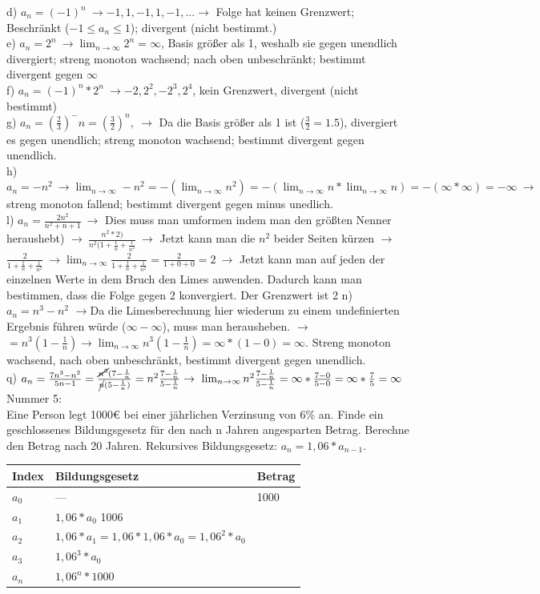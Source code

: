 \documentclass{article}
\newcommand{\tto}{\ensuremath{\to}}
\begin{document}
	d) $a_n=(-1)^n\ \to -1, 1, -1, 1, -1, ... \to$ Folge hat keinen Grenzwert; Beschränkt ($-1\leq a_n \leq 1$); divergent (nicht bestimmt.) \\
	e) $a_n=2^n\ \to \lim_{n\to\infty}2^n=\infty$, Basis größer als 1, weshalb sie gegen unendlich divergiert; streng monoton wachsend; nach oben unbeschränkt; bestimmt divergent gegen $\infty$ \\
	f) $a_n=(-1)^n*2^n\ \to -2, 2^2, -2^3, 2^4$, kein Grenzwert, divergent (nicht bestimmt) \\
	g) $a_n=(\frac{2}{3})^-n=(\frac{3}{2})^n,\ \to$ Da die Basis größer als 1 ist ($\frac{3}{2}=1.5$), divergiert es gegen unendlich; streng monoton wachsend; bestimmt divergent gegen unendlich. \\
	h) $a_n=-n^2\ \to \lim_{n\to\infty}-n^2=-(\lim_{n\to\infty}n^2)=-(\lim_{n\to\infty}n*\lim_{n\to\infty}n)=-(\infty*\infty)=-\infty\ \to$ streng monoton fallend; bestimmt divergent gegen minus unedlich. \\
	l) $a_n=\frac{2n^2}{n^2+n+1}\ \to$ Dies muss man umformen indem man den größten Nenner heraushebt) $\to\ \frac{n^2*2)}{n^2(1+\frac{1}{n}+\frac{1}{n^2}}\ \to$ Jetzt kann man die $n^2$ beider Seiten kürzen $\to$ \\
	$\frac{2}{1+\frac{1}{n}+\frac{1}{n^2}}\ \to \lim_{n\to\infty}\frac{2}{1+\frac{1}{n}+\frac{1}{n^2}}=\frac{2}{1+0+0}=2\ \to$ Jetzt kann man auf jeden der einzelnen Werte in dem Bruch den Limes anwenden. Dadurch kann man bestimmen, dass die Folge gegen 2 konvergiert. Der Grenzwert ist 2
	n) $a_n=n^3-n^2$ \tto Da die Limesberechnung hier wiederum zu einem undefinierten Ergebnis führen würde ($\infty -\infty$), muss man herausheben. \tto $=n^3(1-\frac{1}{n})\to \lim_{n\to\infty}n^3(1-\frac{1}{n})=\infty*(1-0)=\infty$. Streng monoton wachsend, nach oben unbeschränkt, bestimmt divergent gegen unendlich. \\
	q) $a_n=\frac{7n^3-n^2}{5n-1}=\frac{\cancel{n^3}(7-\frac{1}{n}}{\cancel{n}(5-\frac{1}{n})}=n^2\frac{7-\frac{1}{n}}{5-\frac{1}{n}}\to\ \lim_{n\to\infty}n^2\frac{7-\frac{1}{n}}{5-\frac{1}{n}}=\infty*\frac{7-0}{5-0}=\infty*\frac{7}{5}=\infty$\\
	Nummer 5: \\
	Eine Person legt 1000€ bei einer jährlichen Verzinsung von 6\% an. Finde ein geschlossenes Bildungsgesetz für den nach n Jahren angesparten Betrag. Berechne den Betrag nach 20 Jahren. Rekursives Bildungsgesetz: $a_n=1,06*a_{n-1}$. \\
	\begin{tabular}{| l | l | l |}
		\toprule
		Index & Bildungsgesetz & Betrag \\ \midrule
		$a_0$ & --- & 1000 \\ \hline
		$a_1$ & $1,06*a_0$ 1006 & \\ \hline
		$a_2$ & $1,06*a_1=1,06*1,06*a_0=1,06^2*a_0$ & \\ \hline
		$a_3$ & $1,06^3*a_0$ & \\ \hline
		$a_n$ & $1,06^n*1000$ & \\
		\bottomrule
	\end{tabular} \\
\end{document}
